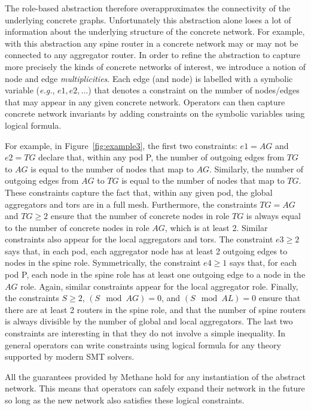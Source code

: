 \documentclass{sig-alternate-10pt}
\newcommand{\EG}{\emph{e.g.}}
\newcommand{\sysname}{{\small \sf Methane}\xspace}
\begin{document}
The role-based abstraction therefore overapproximates the connectivity of the underlying concrete graphs. Unfortunately this abstraction alone loses a lot of information about the underlying structure of the concrete network. For example, with this abstraction any spine router in a concrete network may or may not be connected to any aggregator router.
%
In order to refine the abstraction to capture more precisely the kinds of concrete networks of interest,
we introduce a notion of node and edge \emph{multiplicities}. Each edge (and node) is labelled
with a symbolic variable (\EG, $e1, e2, \ldots$) that denotes a constraint on the number of nodes/edges
that may appear in any given concrete network. Operators can then capture concrete network invariants by adding constraints on the symbolic variables using logical formula.

For example, in Figure~\ref{fig:example3}, the first two constraints: $e1 = AG$ and $e2 = TG$ declare that, within any pod P, the number of outgoing edges from $TG$ to $AG$ is equal to the number of nodes that map to $AG$. Similarly, the number of outgoing edges from $AG$ to $TG$ is equal to the number of nodes that map to $TG$. These constraints capture the fact that, within any given pod, the global aggregators and tors are in a full mesh. Furthermore, the constraints $TG = AG$ and $TG \geq 2$ ensure that the number of concrete nodes in role $TG$ is always equal to the number of concrete nodes in role $AG$, which is at least 2. Similar constraints also appear for the local aggregators and tors.
%
The constraint $e3 \geq 2$ says that, in each pod, each aggregator node has at least 2 outgoing edges to nodes in the spine role. Symmetrically, the constraint $e4 \geq 1$ says that, for each pod P, each node in the spine role has at least one outgoing edge to a node in the $AG$ role. Again, similar constraints appear for the local aggregator role. Finally, the constraints $S \geq 2$, $(S \mod AG) = 0$, and $(S \mod AL) = 0$ ensure that there are at least 2 routers in the spine role, and that the number of spine routers is always divisible by the number of global and local aggregators.
%
The last two constraints are interesting in that they do not involve a simple inequality. In general operators can write constraints using logical formula for any theory supported by modern SMT solvers. 

All the guarantees provided by \sysname hold for any instantiation of the abstract network. This means that operators can safely expand their network in the future so long as the new network also satisfies these logical constraints.
\end{document}
